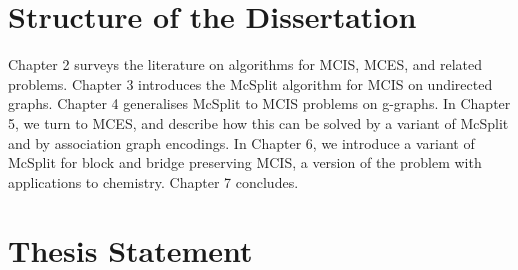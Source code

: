 \section{Structure of the Dissertation}

Chapter 2 surveys the literature on algorithms for MCIS, MCES, and related
problems. Chapter 3 introduces the McSplit algorithm for MCIS on undirected
graphs. Chapter 4 generalises McSplit to MCIS problems on g-graphs. In Chapter
5, we turn to MCES, and describe how this can be solved by a variant of McSplit
and by association graph encodings. In Chapter 6, we introduce a variant of
McSplit for block and bridge preserving MCIS, a version of the problem with
applications to chemistry. Chapter 7 concludes.

\section{Thesis Statement}
\label{c:intro:thesisstatement}


